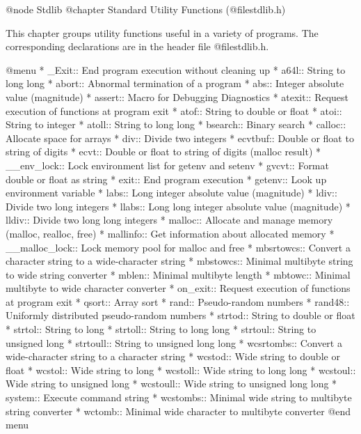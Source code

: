 @node Stdlib
@chapter Standard Utility Functions (@file{stdlib.h})

This chapter groups utility functions useful in a variety of programs.
The corresponding declarations are in the header file @file{stdlib.h}.

@menu 
* _Exit::       End program execution without cleaning up
* a64l::        String to long long
* abort::       Abnormal termination of a program
* abs::         Integer absolute value (magnitude)
* assert::      Macro for Debugging Diagnostics
* atexit::      Request execution of functions at program exit
* atof::        String to double or float
* atoi::        String to integer
* atoll::       String to long long
* bsearch::	Binary search
* calloc::      Allocate space for arrays
* div::         Divide two integers
* ecvtbuf::     Double or float to string of digits
* ecvt::        Double or float to string of digits (malloc result)
* __env_lock::		Lock environment list for getenv and setenv
* gvcvt::       Format double or float as string
* exit::        End program execution
* getenv::      Look up environment variable
* labs::        Long integer absolute value (magnitude)
* ldiv::        Divide two long integers
* llabs::       Long long integer absolute value (magnitude)
* lldiv::       Divide two long long integers
* malloc::      Allocate and manage memory (malloc, realloc, free)
* mallinfo::	Get information about allocated memory
* __malloc_lock::	Lock memory pool for malloc and free
* mbsrtowcs::	Convert a character string to a wide-character string
* mbstowcs::	Minimal multibyte string to wide string converter
* mblen::	Minimal multibyte length
* mbtowc::      Minimal multibyte to wide character converter
* on_exit::     Request execution of functions at program exit
* qsort::	Array sort
* rand::        Pseudo-random numbers
* rand48::      Uniformly distributed pseudo-random numbers
* strtod::      String to double or float
* strtol::      String to long
* strtoll::     String to long long
* strtoul::     String to unsigned long
* strtoull::    String to unsigned long long
* wcsrtombs::	Convert a wide-character string to a character string
* wcstod::      Wide string to double or float
* wcstol::      Wide string to long
* wcstoll::     Wide string to long long
* wcstoul::     Wide string to unsigned long
* wcstoull::    Wide string to unsigned long long
* system::      Execute command string
* wcstombs::	Minimal wide string to multibyte string converter
* wctomb::      Minimal wide character to multibyte converter
@end menu

